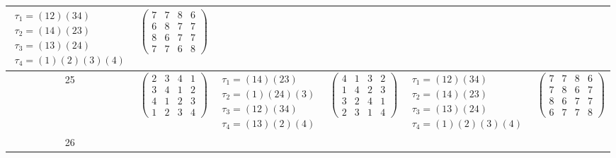 \begin{longtable}{|c|p{2.7cm}|p{2.7cm}|p{2.7cm}|p{2.7cm}|p{2.7cm}|}
    $\begin{array}{l}\tau_{1}=(12)(34)\\ \tau_{2}=(14)(23)\\ \tau_{3}=(13)(24)\\ \tau_{4}=(1)(2)(3)(4)\end{array}$ &
    $\begin{pmatrix} 7 & 7 & 8 & 6 \\ 6 & 8 & 7 & 7 \\ 8 & 6 & 7 & 7 \\ 7 & 7 & 6 & 8 \end{pmatrix}$                                                                                           \\
    \hline
    25                                                                                                             &
    $\begin{pmatrix} 2 & 3 & 4 & 1 \\ 3 & 4 & 1 & 2 \\ 4 & 1 & 2 & 3 \\ 1 & 2 & 3 & 4 \end{pmatrix}$               &
    $\begin{array}{l}\tau_{1}=(14)(23)\\ \tau_{2}=(1)(24)(3)\\ \tau_{3}=(12)(34)\\ \tau_{4}=(13)(2)(4)\end{array}$ &
    $\begin{pmatrix} 4 & 1 & 3 & 2 \\ 1 & 4 & 2 & 3 \\ 3 & 2 & 4 & 1 \\ 2 & 3 & 1 & 4 \end{pmatrix}$               &
    $\begin{array}{l}\tau_{1}=(12)(34)\\ \tau_{2}=(14)(23)\\ \tau_{3}=(13)(24)\\ \tau_{4}=(1)(2)(3)(4)\end{array}$ &
    $\begin{pmatrix} 7 & 7 & 8 & 6 \\ 7 & 8 & 6 & 7 \\ 8 & 6 & 7 & 7 \\ 6 & 7 & 7 & 8 \end{pmatrix}$                                                                                           \\
    \hline
    26                                                                                                             &

\end{longtable}
